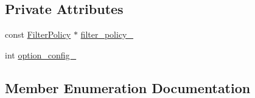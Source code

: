 \subsection*{Private Attributes}
\begin{DoxyCompactItemize}
\item 
const \hyperlink{classleveldb_1_1_filter_policy}{Filter\+Policy} $\ast$ \hyperlink{classleveldb_1_1_d_b_test_ae1f889c52eb541f9e32d147824b67d7a}{filter\+\_\+policy\+\_\+}
\item 
int \hyperlink{classleveldb_1_1_d_b_test_a3cc39d9674e4e47e2be82b023f791bd0}{option\+\_\+config\+\_\+}
\end{DoxyCompactItemize}


\subsection{Member Enumeration Documentation}
\hypertarget{classleveldb_1_1_d_b_test_ade8d30892ac3c99c2a0488c119ef25e7}{}
